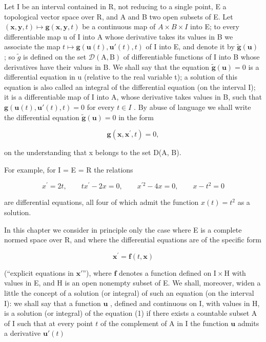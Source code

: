 Let I be an interval contained in R, not reducing to a single point, E a topological vector space over R, and A and B two open subsets of E. Let \((\mathbf{x}, \mathbf{y}, t) \mapsto \mathbf{g}(\mathbf{x}, \mathbf{y}, t)\) be a continuous map of \(A \times B \times I\) into E; to every differentiable map u of I into A whose derivative takes its values in B we associate the map \(t \mapsto \mathbf{g}(\mathbf{u}(t), \mathbf{u}'(t), t)\) of I into E, and denote it by \(\tilde{\mathbf{g}}(\mathbf{u})\) ; so \(\tilde{g}\) is defined on the set \(\mathcal{D}(\mathrm{A}, \mathrm{B})\) of differentiable functions of I into B whose derivatives have their values in B. We shall say that the equation \(\tilde{\mathbf{g}}(\mathbf{u}) = 0\) is a differential equation in u (relative to the real variable t); a solution of this equation is also called an integral of the differential equation (on the interval I); it is a differentiable map of I into A, whose derivative takes values in B, such that \(\mathbf{g}(\mathbf{u}(t), \mathbf{u}'(t), t) = 0\) for every \(t \in I\) . By abuse of language we shall write the differential equation \(\tilde{\mathbf{g}}(\mathbf{u}) = 0\) in the form

\[
\mathbf {g} (\mathbf {x}, \mathbf {x} ^ {\prime}, t) = 0,
\]

on the understanding that x belongs to the set D(A, B).

For example, for I = E = R the relations

\[
x ^ {\prime} = 2 t, \qquad t x ^ {\prime} - 2 x = 0, \qquad x ^ {\prime 2} - 4 x = 0, \qquad x - t ^ {2} = 0
\]

are differential equations, all four of which admit the function \(x(t) = t^{2}\) as a solution.

In this chapter we consider in principle only the case where E is a complete normed space over R, and where the differential equations are of the specific form

\[
\mathbf {x} ^ {\prime} = \mathbf {f} (t, \mathbf {x})\tag{1}
\]

(``explicit equations in \(\mathbf{x}'\)''), where \(\mathbf{f}\) denotes a function defined on \(\mathrm{I} \times \mathrm{H}\) with values in E, and H is an open nonempty subset of E. We shall, moreover, widen a little the concept of a solution (or integral) of such an equation (on the interval I): we shall say that a function \(\mathbf{u}\) , defined and continuous on I, with values in H, is a solution (or integral) of the equation (1) if there exists a countable subset A of I such that at every point \(t\) of the complement of A in I the function \(\mathbf{u}\) admits a derivative \(\mathbf{u}'(t)\)

